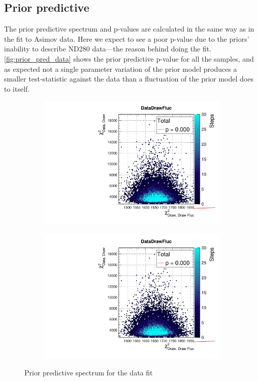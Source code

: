 \subsection{Prior predictive}
The prior predictive spectrum and p-values are calculated in the same way as in the fit to Asimov data. Here we expect to see a poor p-value due to the priors' inability to describe ND280 data---the reason behind doing the fit. \autoref{fig:prior_pred_data} shows the prior predictive p-value for all the samples, and as expected not a single parameter variation of the prior model produces a smaller test-statistic against the data than a fluctuation of the prior model does to itself.
\begin{figure}[h]
	\begin{subfigure}[t]{0.49\textwidth}
		\includegraphics[width=\textwidth, trim={0mm 0mm 0mm 11mm}, clip,page=1]{figures/mach3/data/priorpred/2017b_NewDet_3Xsec_4Det_5Flux_NewXSecTune_Data_merge_PriorPred_procs}
	\end{subfigure}
	\begin{subfigure}[t]{0.49\textwidth}
		\includegraphics[width=\textwidth, trim={0mm 0mm 0mm 11mm}, clip,page=2]{figures/mach3/data/priorpred/2017b_NewDet_3Xsec_4Det_5Flux_NewXSecTune_Data_merge_PriorPred_procs}
	\end{subfigure}
	\caption{Prior predictive spectrum for the data fit}
	\label{fig:prior_pred_data}
\end{figure}

